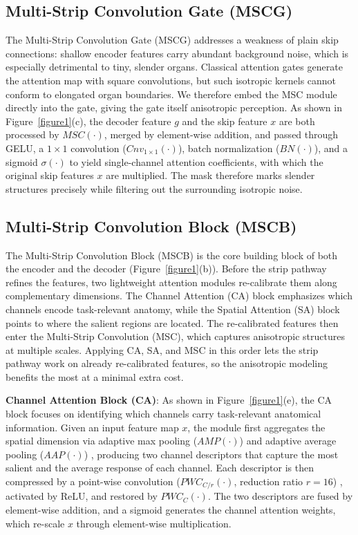 \documentclass{llncs}
\begin{document}
\subsection{Multi-Strip Convolution Gate (MSCG)}

The Multi-Strip Convolution Gate (MSCG) addresses a weakness of plain skip connections: shallow encoder features carry abundant background noise, which is especially detrimental to tiny, slender organs. Classical attention gates \cite{oktay2018attention} generate the attention map with square convolutions, but such isotropic kernels cannot conform to elongated organ boundaries. We therefore embed the MSC module directly into the gate, giving the gate itself anisotropic perception. As shown in Figure~\ref{figure1}(c), the decoder feature $g$ and the skip feature $x$ are both processed by $MSC(\cdot)$, merged by element-wise addition, and passed through GELU, a $1\times1$ convolution ($Cnv_{1\times1}(\cdot)$), batch normalization ($BN(\cdot)$), and a sigmoid $\sigma(\cdot)$ to yield single-channel attention coefficients, with which the original skip features $x$ are multiplied. The mask therefore marks slender structures precisely while filtering out the surrounding isotropic noise.

\subsection{Multi-Strip Convolution Block (MSCB)}

The Multi-Strip Convolution Block (MSCB) is the core building block of both the encoder and the decoder (Figure~\ref{figure1}(b)). Before the strip pathway refines the features, two lightweight attention modules re-calibrate them along complementary dimensions. The Channel Attention (CA) block emphasizes which channels encode task-relevant anatomy, while the Spatial Attention (SA) block points to where the salient regions are located. The re-calibrated features then enter the Multi-Strip Convolution (MSC), which captures anisotropic structures at multiple scales. Applying CA, SA, and MSC in this order lets the strip pathway work on already re-calibrated features, so the anisotropic modeling benefits the most at a minimal extra cost.

\textbf{Channel Attention Block (CA)}\cite{woo2018cbam}: As shown in Figure~\ref{figure1}(e), the CA block focuses on identifying which channels carry task-relevant anatomical information. Given an input feature map $x$, the module first aggregates the spatial dimension via adaptive max pooling ($AMP(\cdot)$) and adaptive average pooling ($AAP(\cdot)$) \cite{he2014spatial}, producing two channel descriptors that capture the most salient and the average response of each channel. Each descriptor is then compressed by a point-wise convolution ($PWC_{C/r}(\cdot)$, reduction ratio $r=16$) \cite{lin2013network}, activated by ReLU, and restored by $PWC_C(\cdot)$. The two descriptors are fused by element-wise addition, and a sigmoid generates the channel attention weights, which re-scale $x$ through element-wise multiplication.
\end{document}
